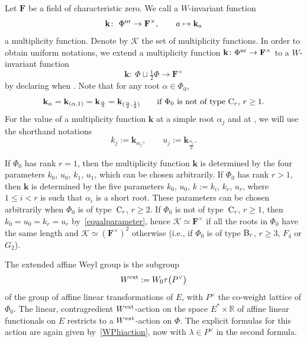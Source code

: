 Let $\mathbf{F}$ be a field of characteristic zero. We call a $W$-invariant function
\[
\mathbf{k}\colon\ \Phi^{\textup{nr}}\rightarrow\mathbf{F}^\times,\qquad a\mapsto \mathbf{k}_a
\]
a multiplicity function. Denote by $\mathcal{K}$ the set of multiplicity functions.
In order to obtain uniform notations, we extend a multiplicity function
$\mathbf{k}\colon \Phi^{\textup{nr}}\rightarrow\mathbf{F}^\times$ to a $W$-invariant function
\[
\mathbf{k}\colon\ \Phi\sqcup\tfrac{1}{2}\Phi\rightarrow\mathbf{F}^\times
\]
by declaring  when . Note that for any root $\alpha\in\Phi_0$,
\begin{equation}
\label{equalparameter}
\mathbf{k}_\alpha=\mathbf{k}_{(\alpha,1)}=\mathbf{k}_{\frac{\alpha}{2}}=\mathbf{k}_{(\frac{\alpha}{2},\frac{1}{2})}\qquad \textup{if $\Phi_0$ is not of type ${\rm C}_r$, $r\geq 1$}.
\end{equation}
For the value of a multiplicity function $\mathbf{k}$ at a simple root $\alpha_j$ and at , we will use the shorthand notations
\[
k_j:=\mathbf{k}_{\alpha_j},\qquad u_j:=\mathbf{k}_{\frac{\alpha_j}{2}}.
\]

If $\Phi_0$ has rank $r=1$, then
the multiplicity function $\mathbf{k}$ is determined by the four parameters $k_0$, $u_0$, $k_1$, $u_1$, which can be chosen arbitrarily.
If $\Phi_0$ has rank $r>1$, then $\mathbf{k}$ is determined by the five parameters $k_0$, $u_0$, $k:=k_i$, $k_r$, $u_r$, where $1\leq i<r$ is such that $\alpha_i$ is a short root. These parameters can be chosen arbitrarily
when $\Phi_0$ is of type~${\rm C}_r$, $r\geq 2$. If $\Phi_0$ is not of type~${\rm C}_r$, $r\geq 1$,
then $k_0=u_0=k_r=u_r$ by~\eqref{equalparameter}, hence $\mathcal{K}\simeq\mathbf{F}^\times$ if all the roots in $\Phi_0$ have the same length and $\mathcal{K}\simeq (\mathbf{F}^\times)^2$ otherwise (i.e., if $\Phi_0$ is of type $\textup{B}_r$, $r\geq 3$, $F_4$ or $G_2$).

The extended affine Weyl group is the subgroup
\[
W^{\textup{ext}}:=W_0\tau\bigl(P^\vee\bigr)
\]
of the group of affine linear transformations of $E$,
with $P^\vee$ the co-weight lattice of $\Phi_0$. The linear, contragredient $W^{\textup{ext}}$-action on the space $E^*\times\mathbb{R}$ of affine linear functionals on $E$ restricts to a $W^{\textup{ext}}$-action on $\Phi$. The explicit formulas for this action are again given by~\eqref{WPhiaction}, now with $\lambda\in P^\vee$ in the second formula.

